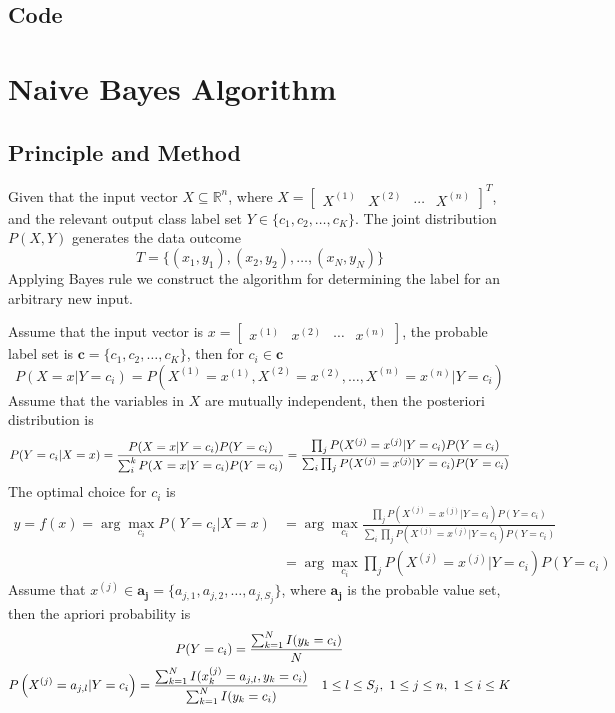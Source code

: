 \documentclass[12pt]{article}
\begin{document}
\subsection{Code}

\section{Naive Bayes Algorithm}
\subsection{Principle and Method}
Given that the input vector $X \subseteq \mathbb{R}^n$, where $X = \begin{bmatrix} X^{(1)} & X^{(2)} & \cdots & X^{(n)} \end{bmatrix}^T$, and the relevant output class label set $Y \in \{c_1, c_2, \dots, c_K\}$. The joint distribution $P(X,Y)$ generates the data outcome
\begin{equation}
    T=\{(x_1, y_1),(x_2,y_2),\dots,(x_N,y_N)\}
\end{equation}
Applying Bayes rule we construct the algorithm for determining the label for an arbitrary new input.
\par
Assume that the input vector is $x = \begin{bmatrix}
x^{(1)} & x^{(2)} & \cdots & x^{(n)} \end{bmatrix}$, the probable label set is $\bm{c} = \{c_1, c_2, \dots, c_K\}$, then for $c_i \in \bm{c}$
\begin{equation}
    P(X = x|Y = c_i) = P\left( X^{(1)} = x^{(1)}, X^{(2)} = x^{(2)}, \dots, X^{(n)} = x^{(n)}| Y = c_i\right)
\end{equation}
Assume that the variables in $X$ are mutually independent, then the posteriori distribution is
\begin{equation}
    P(Y = c_i|X = x) = \frac{P(X = x|Y = c_i)P(Y=c_i)}{\sum_i^k P(X=x|Y = c_i)P(Y=c_i)} = \frac{\prod_{j}P(X^{(j)} = x^{(j)}|Y = c_i)P(Y=c_i)}{\sum_i \prod_{j}P(X^{(j)} = x^{(j)}|Y = c_i)P(Y=c_i)} \notag
\end{equation}
The optimal choice for $c_i$ is
\begin{equation}
\begin{aligned}
    y = f(x) = \arg \max_{c_i} P(Y = c_i|X = x) &= \arg \max_{c_i} \frac{ \prod_{j}P(X^{(j)} = x^{(j)}|Y = c_i)P(Y=c_i)}{\sum_i \prod_{j}P(X^{(j)} = x^{(j)}|Y = c_i)P(Y=c_i)} \\
    &= \arg \max_{c_i} \prod_{j}P(X^{(j)} = x^{(j)}|Y = c_i)P(Y=c_i)
\end{aligned}
\end{equation}
Assume that $x^{(j)} \in \bm{a_j} = \{a_{j,1}, a_{j,2}, \dots, a_{j,S_j}\}$, where $\bm{a_j}$ is the probable value set, then the apriori probability is
\begin{gather}
    P(Y = c_i) = \frac{\sum_{k=1}^N I(y_k = c_i)}{N} \notag \\
    P\left(X^{(j)} = a_{j,l}|Y = c_i \right) = \frac{\sum_{k=1}^N I(x_k^{(j)} = a_{j,l}, y_k = c_i)}{\sum_{k=1}^N I(y_k = c_i)} ~~~1 \leq l \leq S_{j},~1\leq j \leq n,~1 \leq i \leq K\notag
\end{gather}
\end{document}
